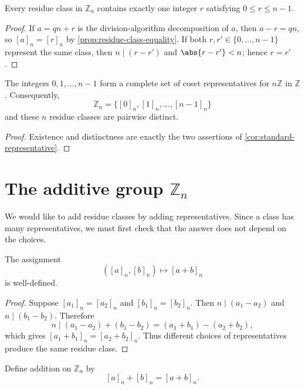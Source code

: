 \begin{corollary}\label{cor:standard-representative}
	Every residue class in \(\mathbb Z_n\) contains exactly one integer \(r\) satisfying
	\(0\leq r\leq n-1\).
\end{corollary}

\begin{proof}
	If \(a=qn+r\) is the division-algorithm decomposition of \(a\), then
	\(a-r=qn\), so \([a]_n=[r]_n\) by
	\autoref{prop:residue-class-equality}. If both \(r,r'\in\{0,\ldots,n-1\}\)
	represent the same class, then \(n\mid(r-r')\) and \(\abs{r-r'}<n\); hence
	\(r=r'\).
\end{proof}

\begin{corollary}\label{cor:Zn-list}
	The integers \(0,1,\ldots,n-1\) form a complete set of coset representatives for
	\(n\mathbb Z\) in \(\mathbb Z\). Consequently,
	\[
		\mathbb Z_n=\{[0]_n,[1]_n,\ldots,[n-1]_n\}
	\]
	and these \(n\) residue classes are pairwise distinct.
\end{corollary}

\begin{proof}
	Existence and distinctness are exactly the two assertions of
	\autoref{cor:standard-representative}.
\end{proof}

\section{The additive group \(\mathbb Z_n\)}

We would like to add residue classes by adding representatives. Since a class has many
representatives, we must first check that the answer does not depend on the choices.

\begin{lemma}\label{lem:addition-well-defined}
	The assignment
	\[
		([a]_n,[b]_n)\longmapsto[a+b]_n
	\]
	is well-defined.
\end{lemma}

\begin{proof}
	Suppose \([a_1]_n=[a_2]_n\) and \([b_1]_n=[b_2]_n\). Then
	\(n\mid(a_1-a_2)\) and \(n\mid(b_1-b_2)\). Therefore
	\[
		n\mid (a_1-a_2)+(b_1-b_2)=(a_1+b_1)-(a_2+b_2),
	\]
	which gives \([a_1+b_1]_n=[a_2+b_2]_n\). Thus different choices of
	representatives produce the same residue class.
\end{proof}

Define addition on \(\mathbb Z_n\) by
\[
	[a]_n+[b]_n=[a+b]_n.
\]

